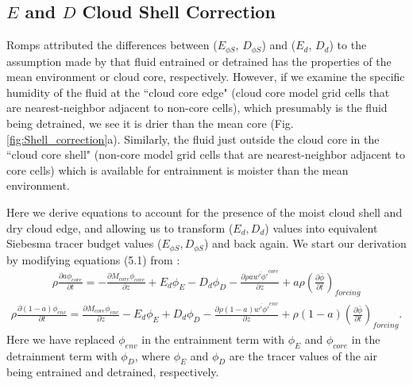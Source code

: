 \documentclass[12pt]{article}
\begin{document}
\subsection{$E$ and $D$ Cloud Shell Correction}

Romps attributed the differences between ($E_{\phi S}$, $D_{\phi S}$) and 
($E_d$, $D_d$) to the assumption made by \cite{Siebesma1995} that fluid 
entrained or detrained has the properties of the mean environment or 
cloud core, respectively.  However, if we examine the specific 
humidity of the fluid at the ``cloud core edge" (cloud core model grid 
cells that are nearest-neighbor adjacent to non-core cells), which 
presumably is the fluid being detrained, we see it is drier than the mean 
core (Fig. \ref{fig:Shell_correction}a).  Similarly, the fluid just 
outside the cloud core in the ``cloud core shell" (non-core model 
grid cells that are nearest-neighbor adjacent to core cells) which is 
available for entrainment is moister than the mean environment.

Here we derive equations to account for the presence of the moist cloud shell 
and dry cloud edge, and allowing us to transform ($E_d, D_d$) values into 
equivalent Siebesma tracer budget values ($E_{\phi S}, D_{\phi S}$) and back
again.  We start our derivation by modifying equations (5.1) from
\cite{Siebesma1995}:
\begin{eqnarray}
  \label{eq:entrainment_derivation_1}
    \rho \frac{\partial a \phi_{core}}{\partial t} 
    = - \frac{\partial M_{core} \phi_{core}}{\partial z} 
    + E_d \phi_E - D_d \phi_D
    - \frac{\partial \rho a \overline{w' \phi'}^{core}}{\partial z} 
    + a \rho \left(\frac{\partial \bar{\phi}}{\partial t}\right)_{forcing}
\end{eqnarray}
\begin{eqnarray}
  \label{eq:detrainment_derivation_1}
    \rho \frac{\partial (1 - a) \phi_{env}}{\partial t}
    = \frac{\partial M_{core} \phi_{env}}{\partial z} 
    - E_d \phi_E + D_d \phi_D
    - \frac{\partial \rho (1 - a) \overline{w' \phi'}^{env}}{\partial z} 
    + \rho (1 - a) \left(\frac{\partial \bar{\phi}}{\partial t}\right)_{forcing}.
\end{eqnarray}
Here we have replaced $\phi_{env}$ in the entrainment term with $\phi_E$ and 
$\phi_{core}$ in the detrainment term with $\phi_D$, where $\phi_E$ and $\phi_D$
are the tracer values of the air being entrained and detrained, respectively.
\end{document}
